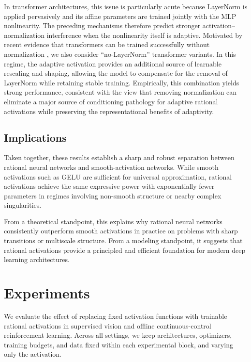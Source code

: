 \documentclass{article}
\theoremstyle{plain}
\theoremstyle{definition}
\theoremstyle{remark}
\begin{document}
In transformer architectures, this issue is particularly acute because LayerNorm is applied pervasively and its affine parameters are trained jointly with the MLP nonlinearity. The preceding mechanisms therefore predict stronger activation--normalization interference when the nonlinearity itself is adaptive. Motivated by recent evidence that transformers can be trained successfully without normalization \citep{zhu2025transformerswithoutnorm}, we also consider ``no-LayerNorm'' transformer variants. In this regime, the adaptive activation provides an additional source of learnable rescaling and shaping, allowing the model to compensate for the removal of LayerNorm while retaining stable training. Empirically, this combination yields strong performance, consistent with the view that removing normalization can eliminate a major source of conditioning pathology for adaptive rational activations while preserving the representational benefits of adaptivity.

\subsection{Implications}

Taken together, these results establish a sharp and robust separation between rational neural networks and smooth-activation networks.  
While smooth activations such as GELU are sufficient for universal approximation, rational activations achieve the same expressive power with exponentially fewer parameters in regimes involving non-smooth structure or nearby complex singularities.

From a theoretical standpoint, this explains why rational neural networks consistently outperform smooth activations in practice on problems with sharp transitions or multiscale structure. From a modeling standpoint, it suggests that rational activations provide a principled and efficient foundation for modern deep learning architectures.


\section{Experiments}

We evaluate the effect of replacing fixed activation functions with trainable rational activations in supervised vision and offline continuous-control reinforcement learning. Across all settings, we keep architectures, optimizers, training budgets, and data fixed within each experimental block, and varying only the activation. 
\end{document}

